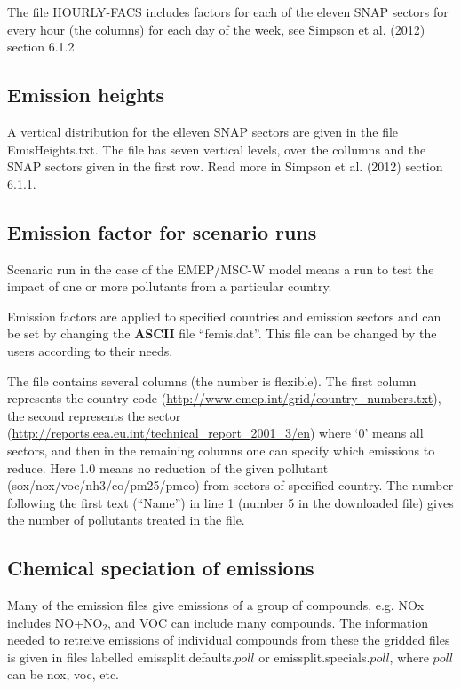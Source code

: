 The file HOURLY-FACS 
includes factors for each of the eleven SNAP sectors for every hour (the columns) for 
each day of the week, see Simpson et al. (2012) section 6.1.2


\subsection{Emission heights}
A vertical distribution for the elleven SNAP sectors are given in the file EmisHeights.txt. 
The file has seven vertical levels, over the collumns and the SNAP sectors given in the first row. 
Read more in Simpson et al. (2012) section 6.1.1.

\subsection{Emission factor for scenario runs}\label{sec:femis}
Scenario run in the case of the EMEP/MSC-W model means a run to test
the impact of one or more pollutants from a particular
country. 

Emission factors are applied to specified countries and
emission sectors and can be set by changing the {\bf ASCII} file
``femis.dat''. 
This file can be changed by the users according to their needs.

The file contains several columns (the number is flexible). The first column represents
the country code (\url{http://www.emep.int/grid/country_numbers.txt}),
the second represents the sector
(\url{http://reports.eea.eu.int/technical_report_2001_3/en}) 
where `0' means all sectors, and then in the remaining
 columns one can specify
which emissions to reduce. Here 1.0 means no reduction of the given
pollutant 
(sox/nox/voc/nh3/co/pm25/pmco) from sectors of specified country. The
number following the first text (``Name'') in line 1 (number 5 in
the downloaded file) gives the number of pollutants treated in the file.


\subsection{Chemical speciation of emissions}

Many of the emission files give emissions of a group of compounds, e.g.
NOx includes NO+NO$_2$, and VOC can include many compounds. The information
needed to retreive emissions of individual compounds from these the
gridded files is given in  files labelled emissplit.defaults.$poll$ or
emissplit.specials.$poll$, where $poll$ can be nox, voc, etc.

